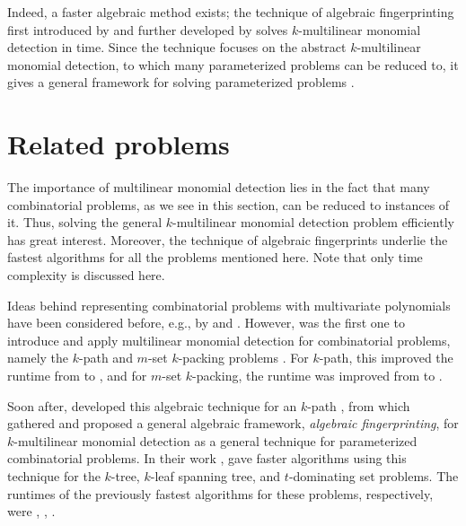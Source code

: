 Indeed, a faster algebraic method exists; the technique of algebraic fingerprinting 
first introduced by \citeauthor{Koutis08} \cite{Koutis08} and 
further developed by \citeauthor{Williams09} \cite{Williams09} 
solves $k$-multilinear monomial detection in  time. 
Since the technique focuses on the abstract $k$-multilinear monomial detection, 
to which many parameterized problems can be reduced to, 
it gives a general framework for 
solving parameterized problems \cite{KouWil15}.

\section{Related problems} %
\label{sect:related_problems}

The importance of multilinear monomial detection lies in the fact 
that many combinatorial problems, as we see in this section, 
can be reduced to instances of it. 
Thus, solving the general $k$-multilinear monomial detection problem 
efficiently has great interest. 
Moreover, the technique of algebraic fingerprints underlie the fastest algorithms 
for all the problems mentioned here. 
Note that only time complexity is discussed here. 

Ideas behind representing combinatorial problems with multivariate polynomials have 
been considered before, e.g., by \citeauthor{Valiant92} \cite{Valiant92} and 
\citeauthor{Koutis05} \cite{Koutis05}. However, 
\citeauthor{Koutis08} was the first one to introduce and apply multilinear monomial 
detection for combinatorial problems, namely the $k$-path and $m$-set $k$-packing problems 
\cite{Koutis08}. For $k$-path, this improved the runtime from 
 \cite{Chen07} to , and for $m$-set $k$-packing, 
the runtime was improved from  \cite{Koutis05} to .

Soon after, \citeauthor{Williams09} developed this algebraic technique 
for an  $k$-path \cite{Williams09}, 
from which \citeauthor{KouWil09} \cite{KouWil09, KouWil15} 
gathered and proposed a general 
 algebraic framework, 
\emph{algebraic fingerprinting}, for $k$-multilinear monomial detection 
as a general technique for 
parameterized combinatorial problems. In their work \cite{KouWil09}, 
\citeauthor{KouWil09} gave faster  algorithms using this technique for the 
$k$-tree, $k$-leaf spanning tree, and $t$-dominating set problems. %
The runtimes of the previously fastest algorithms for these problems, respectively, were   
 \cite{Alon95},  \cite{Kneis11},  \cite{Kneis07}. 

